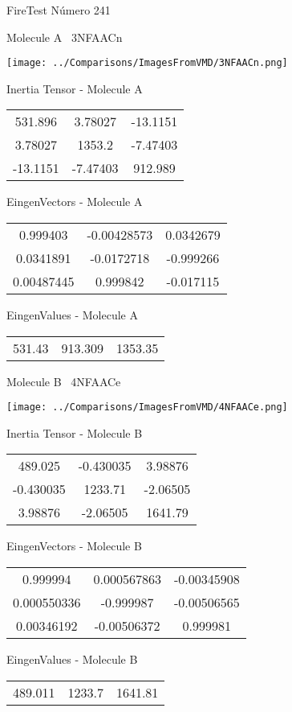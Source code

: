 \vtab[-3cm]
\begin{center}
{\large FireTest \tab Número 241}
\end{center}
\begin{multicols}{2}
\begin{center}

Molecule A \
3NFAACn

\texttt{[image: ../Comparisons/ImagesFromVMD/3NFAACn.png]}

Inertia Tensor - Molecule A \\
\begin{tabular}{|c c c|}
531.896	 & 	3.78027	 & 	-13.1151	 \\
3.78027	 & 	1353.2	 & 	-7.47403	 \\
-13.1151	 & 	-7.47403	 & 	912.989
\end{tabular}

\vtab
 EingenVectors - Molecule A     \\
\begin{tabular}{|c c c|}
0.999403	 & 	-0.00428573	 & 	0.0342679	 \\
0.0341891	 & 	-0.0172718	 & 	-0.999266	 \\
0.00487445	 & 	0.999842	 & 	-0.017115
\end{tabular}

\vtab
 EingenValues - Molecule A     \\
\begin{tabular}{|c c c|}
531.43	 & 	913.309	 & 	1353.35	 \\
\end{tabular}
\columnbreak

Molecule B \
4NFAACe

\texttt{[image: ../Comparisons/ImagesFromVMD/4NFAACe.png]}

Inertia Tensor - Molecule B \\
\begin{tabular}{|c c c|}
489.025	 & 	-0.430035	 & 	3.98876	 \\
-0.430035	 & 	1233.71	 & 	-2.06505	 \\
3.98876	 & 	-2.06505	 & 	1641.79
\end{tabular}

\vtab
 EingenVectors - Molecule B     \\
\begin{tabular}{|c c c|}
0.999994	 & 	0.000567863	 & 	-0.00345908	 \\
0.000550336	 & 	-0.999987	 & 	-0.00506565	 \\
0.00346192	 & 	-0.00506372	 & 	0.999981
\end{tabular}

\vtab
 EingenValues - Molecule B     \\
\begin{tabular}{|c c c|}
489.011	 & 	1233.7	 & 	1641.81	 \\
\end{tabular}

\end{center}
\end{multicols}

